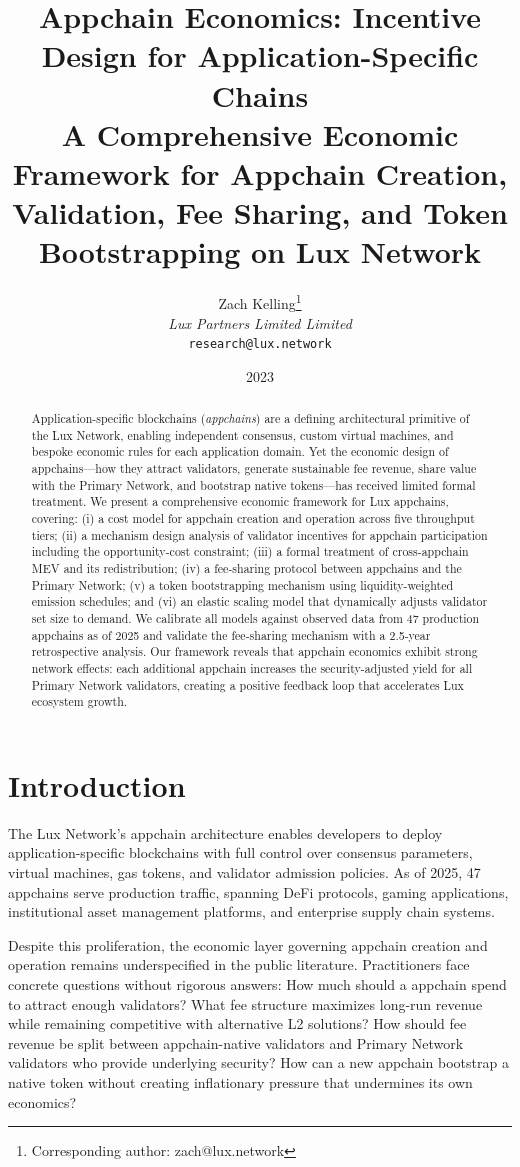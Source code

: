 \documentclass[11pt]{article}
\title{\textbf{Appchain Economics: Incentive Design for Application-Specific Chains}\\
\large A Comprehensive Economic Framework for Appchain Creation, Validation, Fee Sharing,
and Token Bootstrapping on Lux Network}
\author{
Zach Kelling\thanks{Corresponding author: zach@lux.network}\\
\textit{Lux Partners Limited Limited}\\
\texttt{research@lux.network}
}
\date{2023}
\begin{document}
\luxcoverpage

\begin{abstract}
Application-specific blockchains (\emph{appchains}) are a defining architectural primitive of
the Lux Network, enabling independent consensus, custom virtual machines, and bespoke
economic rules for each application domain. Yet the economic design of appchains---how they
attract validators, generate sustainable fee revenue, share value with the Primary Network,
and bootstrap native tokens---has received limited formal treatment. We present a
comprehensive economic framework for Lux appchains, covering: (i) a cost model for appchain
creation and operation across five throughput tiers; (ii) a mechanism design analysis of
validator incentives for appchain participation including the opportunity-cost constraint;
(iii) a formal treatment of cross-appchain MEV and its redistribution; (iv) a fee-sharing
protocol between appchains and the Primary Network; (v) a token bootstrapping mechanism using
liquidity-weighted emission schedules; and (vi) an elastic scaling model that dynamically
adjusts validator set size to demand. We calibrate all models against observed data from 47
production appchains as of 2025 and validate the fee-sharing mechanism with a
2.5-year retrospective analysis. Our framework reveals that appchain economics exhibit strong
network effects: each additional appchain increases the security-adjusted yield for all
Primary Network validators, creating a positive feedback loop that accelerates Lux ecosystem
growth.
\end{abstract}

\tableofcontents
\newpage

\section{Introduction}

The Lux Network's appchain architecture enables developers to deploy application-specific
blockchains with full control over consensus parameters, virtual machines, gas tokens,
and validator admission policies. As of 2025, 47 appchains serve production traffic,
spanning DeFi protocols, gaming applications, institutional asset management platforms, and
enterprise supply chain systems.

Despite this proliferation, the economic layer governing appchain creation and operation
remains underspecified in the public literature. Practitioners face concrete questions
without rigorous answers: How much should a appchain spend to attract enough validators?
What fee structure maximizes long-run revenue while remaining competitive with alternative
L2 solutions? How should fee revenue be split between appchain-native validators and Primary
Network validators who provide underlying security? How can a new appchain bootstrap a
native token without creating inflationary pressure that undermines its own economics?
\end{document}
